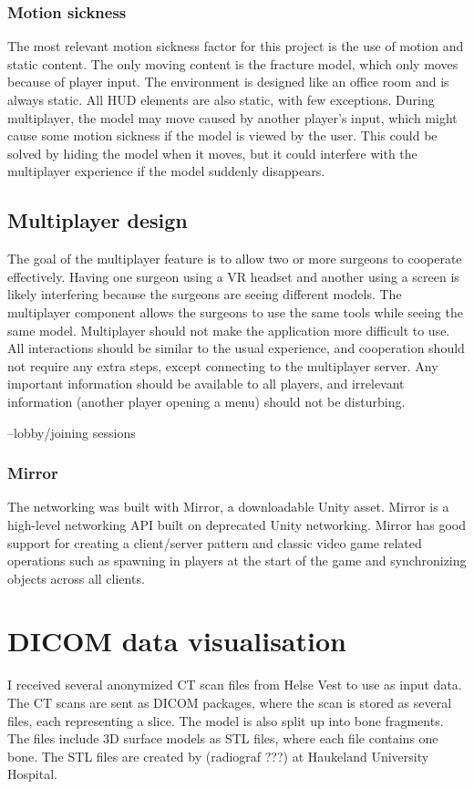 \documentclass[a4paper]{report}
\begin{document}
\subsubsection{Motion sickness}
The most relevant motion sickness factor for this project is the use of motion and static content. The only moving content is the fracture model, which only moves because of player input. The environment is designed like an office room and is always static. All HUD elements are also static, with few exceptions.
During multiplayer, the model may move caused by another player's input, which might cause some motion sickness if the model is viewed by the user. This could be solved by hiding the model when it moves, but it could interfere with the multiplayer experience if the model suddenly disappears.

\subsection{Multiplayer design}
The goal of the multiplayer feature is to allow two or more surgeons to cooperate effectively. Having one surgeon using a VR headset and another using a screen is likely interfering because the surgeons are seeing different models. The multiplayer component allows the surgeons to use the same tools while seeing the same model.
Multiplayer should not make the application more difficult to use. All interactions should be similar to the usual experience, and cooperation should not require any extra steps, except connecting to the multiplayer server. Any important information should be available to all players, and irrelevant information (another player opening a menu) should not be disturbing.

--lobby/joining sessions

\subsubsection{Mirror}
The networking was built with Mirror, a downloadable Unity asset. Mirror is a high-level networking API built on deprecated Unity networking\cite{noauthor_mirror_nodate}. Mirror has good support for creating a client/server pattern and classic video game related operations such as spawning in players at the start of the game and synchronizing objects across all clients.

\section{DICOM data visualisation}
I received several anonymized CT scan files from Helse Vest to use as input data. The CT scans are sent as DICOM packages\cite{noauthor_dicom_nodate}, where the scan is stored as several files, each representing a slice.
The model is also split up into bone fragments. The files include 3D surface models as STL files, where each file contains one bone. The STL files are created by (radiograf ???) at Haukeland University Hospital.
\end{document}

